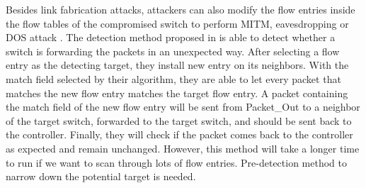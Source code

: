 Besides link fabrication attacks, attackers can also modify the flow entries inside the flow tables of the compromised switch to perform MITM, eavesdropping or DOS attack \cite{AAS14}. The detection method proposed in \cite{CKGL15} is able to detect whether a switch is forwarding the packets in an unexpected way. After selecting a flow entry as the detecting target, they install new entry on its neighbors. With the match field selected by their algorithm, they are able to let every packet that matches the new flow entry matches the target flow entry. A packet containing the match field of the new flow entry will be sent from Packet\_Out to a neighbor of the target switch, forwarded to the target switch, and should be sent back to the controller. Finally, they will check if the packet comes back to the controller as expected and remain unchanged. However, this method will take a longer time to run if we want to scan through lots of flow entries. Pre-detection method to narrow down the potential target is needed.
